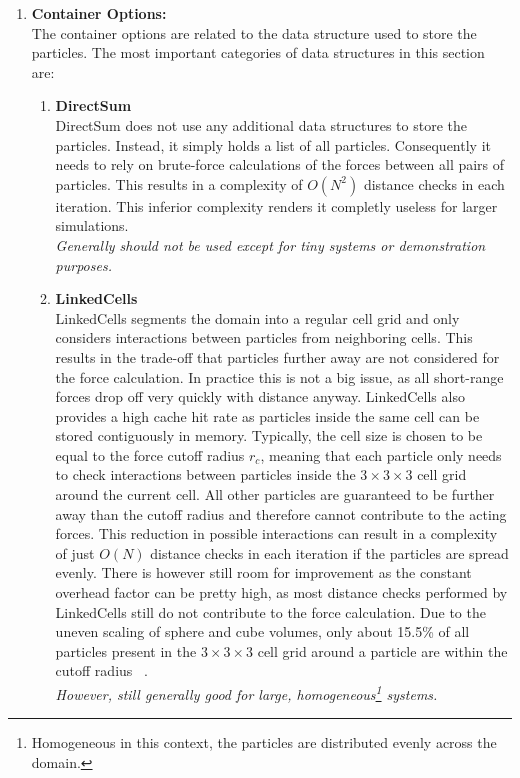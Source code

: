 \begin{enumerate}[label=\textbf{\arabic*.}]
      \item \textbf{Container Options:} \\
            The container options are related to the data structure used to store the particles. The most important categories of data structures in this section are:
            \begin{enumerate}
                  \item \textbf{DirectSum} \\
                        DirectSum does not use any additional data structures to store the particles. Instead, it simply holds a list of all particles. Consequently it needs to rely on brute-force calculations of the forces between all pairs of particles. This results in a complexity of $O(N^2)$ distance checks in each iteration. This inferior complexity renders it completly useless for larger simulations.\\
                        \textit{Generally should not be used except for tiny systems or demonstration purposes.~\cite{VICCIONE2008625}}
                  \item \textbf{LinkedCells} \\
                        LinkedCells segments the domain into a regular cell grid and only considers interactions between particles from neighboring cells. This results in the trade-off that particles further away are not considered for the force calculation. In practice this is not a big issue, as all short-range forces drop off very quickly with distance anyway.
                        LinkedCells also provides a high cache hit rate as particles inside the same cell can be stored contiguously in memory. Typically, the cell size is chosen to be equal to the force cutoff radius $r_c$, meaning that each particle only needs to check interactions between particles inside the $3\times3\times3$ cell grid around the current cell. All other particles are guaranteed to be further away than the cutoff radius and therefore cannot contribute to the acting forces.
                        This reduction in possible interactions can result in a complexity of just $O(N)$ distance checks in each iteration if the particles are spread evenly. There is however still room for improvement as the constant overhead factor can be pretty high, as most distance checks performed by LinkedCells still do not contribute to the force calculation. Due to the uneven scaling of sphere and cube volumes, only about 15.5\% of all particles present in the $3\times3\times3$ cell grid around a particle are within the cutoff radius ~\cite{GRATL2019748}.\\
                        \textit{However, still generally good for large, homogeneous\footnote{Homogeneous in this context, the particles are distributed evenly across the domain.} systems.}


\end{enumerate}
\end{enumerate}
